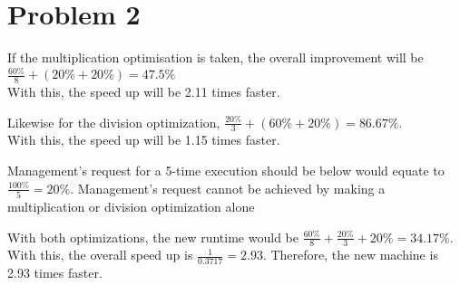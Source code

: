 \section*{Problem 2}
If the multiplication optimisation is taken, the overall improvement will be\\ $\displaystyle\frac{60\%}{8}+(20\%+20\%)=47.5\%$\\With this, the speed up will be 2.11 times faster.

\noindent
Likewise for the division optimization, $\displaystyle\frac{20\%}{3}+(60\%+20\%)=86.67\%$.\\
With this, the speed up will be  1.15 times faster.

\noindent
Management's request for a 5-time execution should be below would equate to $\frac{100\%}{5}=20\%$. Management's request cannot be achieved by making a multiplication or division optimization alone

\noindent
With both optimizations, the new runtime would be $\frac{60\%}{8}+\frac{20\%}{3}+20\%=34.17\%$.\\
With this, the overall speed up is $\frac{1}{0.3717}=2.93$. Therefore, the new machine is 2.93 times faster.